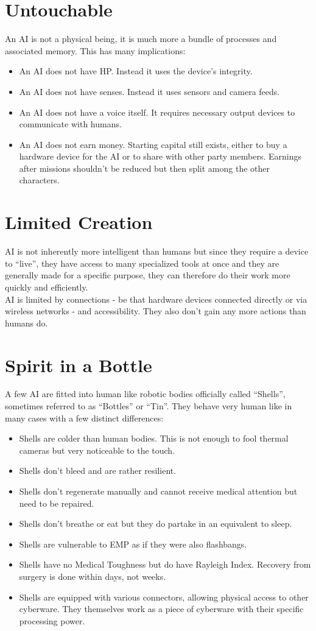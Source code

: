 \documentclass[12pt,a4paper,openany]{book}
\begin{document}
	\chapter{Untouchable}
	An AI is not a physical being, it is much more a bundle of processes and associated memory. This has many implications:
	\begin{itemize}
		\item An AI does not have HP. Instead it uses the device’s integrity.
		\item An AI does not have senses. Instead it uses sensors and camera feeds.
		\item An AI does not have a voice itself. It requires necessary output devices to communicate with humans.
		\item An AI does not earn money. Starting capital still exists, either to buy a hardware device for the AI or to share with other party members. Earnings after missions shouldn’t be reduced but then split among the other characters.
	\end{itemize}

	\chapter{Limited Creation}
	AI is not inherently more intelligent than humans but since they require a device to “live”, they have access to many specialized tools at once and they are generally made for a specific purpose, they can therefore do their work more quickly and efficiently.\\
	AI is limited by connections - be that hardware devices connected directly or via wireless networks - and accessibility. They also don’t gain any more actions than humans do.

	\chapter{Spirit in a Bottle}
	A few AI are fitted into human like robotic bodies officially called “Shells”, sometimes referred to as “Bottles” or “Tin”. They behave very human like in many cases with a few distinct differences:
	\begin{itemize}
		\item Shells are colder than human bodies. This is not enough to fool thermal cameras but very noticeable to the touch.
		\item Shells don’t bleed and are rather resilient.
		\item Shells don’t regenerate manually and cannot receive medical attention but need to be repaired.
		\item Shells don’t breathe or eat but they do partake in an equivalent to sleep.
		\item Shells are vulnerable to EMP as if they were also flashbangs.
		\item Shells have no Medical Toughness but do have Rayleigh Index. Recovery from surgery is done within days, not weeks.
		\item Shells are equipped with various connectors, allowing physical access to other cyberware. They themselves work as a piece of cyberware with their specific processing power.
	\end{itemize}
\end{document}
